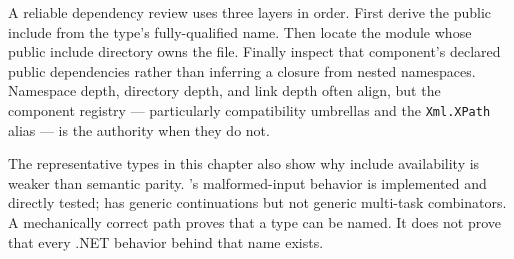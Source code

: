 A reliable dependency review uses three layers in order. First derive the public include from
the type's fully-qualified name. Then locate the module whose public include directory owns the
file. Finally inspect that component's declared public dependencies rather than inferring a
closure from nested namespaces. Namespace depth, directory depth, and link depth often align,
but the component registry --- particularly compatibility umbrellas and the \texttt{Xml.XPath}
alias --- is the authority when they do not.

The representative types in this chapter also show why include availability is weaker than
semantic parity. 's malformed-input behavior is implemented and directly
tested;  has generic continuations but not generic multi-task
combinators. A mechanically correct path proves that a type can be named. It does not prove that
every .NET behavior behind that name exists.
